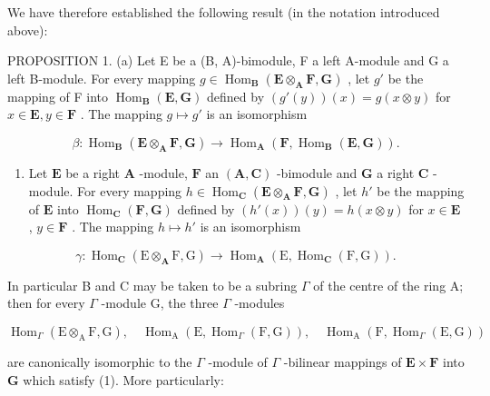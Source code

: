 We have therefore established the following result (in the notation introduced above):

PROPOSITION 1. (a) Let E be a (B, A)-bimodule, F a left A-module and G a left B-module. For every mapping \(g \in \operatorname{Hom}_{\mathbf{B}}(\mathbf{E} \otimes_{\mathbf{A}} \mathbf{F}, \mathbf{G})\) , let \(g'\) be the mapping of F into \(\operatorname{Hom}_{\mathbf{B}}(\mathbf{E}, \mathbf{G})\) defined by \((g'(y))(x) = g(x \otimes y)\) for \(x \in \mathbf{E}, y \in \mathbf{F}\) . The mapping \(g \mapsto g'\) is an isomorphism

\[
\beta : \operatorname{Hom} _ {\mathbf {B}} (\mathbf {E} \otimes_ {\mathbf {A}} \mathbf {F}, \mathbf {G}) \rightarrow \operatorname{Hom} _ {\mathbf {A}} (\mathbf {F}, \operatorname{Hom} _ {\mathbf {B}} (\mathbf {E}, \mathbf {G})).\tag{5}
\]

\begin{enumerate}
\def\labelenumi{(\alph{enumi})}
\setcounter{enumi}{1}
\tightlist
\item
  Let \(\mathbf{E}\) be a right \(\mathbf{A}\) -module, \(\mathbf{F}\) an \((\mathbf{A}, \mathbf{C})\) -bimodule and \(\mathbf{G}\) a right \(\mathbf{C}\) -module. For every mapping \(h \in \operatorname{Hom}_{\mathbf{C}}(\mathbf{E} \otimes_{\mathbf{A}} \mathbf{F}, \mathbf{G})\) , let \(h'\) be the mapping of \(\mathbf{E}\) into \(\operatorname{Hom}_{\mathbf{C}}(\mathbf{F}, \mathbf{G})\) defined by \((h'(x))(y) = h(x \otimes y)\) for \(x \in \mathbf{E}\) , \(y \in \mathbf{F}\) . The mapping \(h \mapsto h'\) is an isomorphism
\end{enumerate}

\[
\gamma : \operatorname{Hom} _ {\mathbf {C}} (\mathrm{E} \otimes_ {\mathbf {A}} \mathrm{F}, \mathrm{G}) \rightarrow \operatorname{Hom} _ {\mathbf {A}} (\mathrm{E}, \operatorname{Hom} _ {\mathbf {C}} (\mathrm{F}, \mathrm{G})).\tag{6}
\]

In particular B and C may be taken to be a subring \(\Gamma\) of the centre of the ring A; then for every \(\Gamma\) -module G, the three \(\Gamma\) -modules

\[
\operatorname{Hom} _ {\Gamma} (\mathrm{E} \otimes_ {\mathrm{A}} \mathrm{F}, \mathrm{G}), \quad \operatorname{Hom} _ {\mathrm{A}} (\mathrm{E}, \operatorname{Hom} _ {\Gamma} (\mathrm{F}, \mathrm{G})), \quad \operatorname{Hom} _ {\mathrm{A}} (\mathrm{F}, \operatorname{Hom} _ {\Gamma} (\mathrm{E}, \mathrm{G}))
\]

are canonically isomorphic to the \(\Gamma\) -module of \(\Gamma\) -bilinear mappings of \(\mathbf{E} \times \mathbf{F}\) into \(\mathbf{G}\) which satisfy (1). More particularly:


